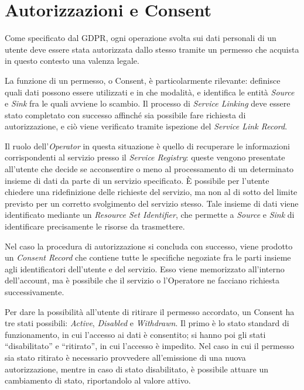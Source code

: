 \section{Autorizzazioni e Consent}
\label{sec:MD-AuthConsent}
Come specificato dal GDPR, ogni operazione svolta sui dati personali di un utente deve essere stata autorizzata dallo stesso tramite un permesso che acquista in questo contesto una valenza legale.

La funzione di un permesso, o Consent, \`e particolarmente rilevante: definisce quali dati possono essere utilizzati e in che modalit\`a, e identifica le entit\`a \textit{Source} e \textit{Sink} fra le quali avviene lo scambio. Il processo di \textit{Service Linking} deve essere stato completato con successo affinch\'e sia possibile fare richiesta di autorizzazione, e ci\`o viene verificato tramite ispezione del \textit{Service Link Record}.

Il ruolo dell’\textit{Operator} in questa situazione \`e quello di recuperare le informazioni corrispondenti al servizio presso il \textit{Service Registry}: queste vengono presentate all’utente che decide se acconsentire o meno al processamento di un determinato insieme di dati da parte di un servizio specificato. \`E possibile per l’utente chiedere una ridefinizione delle richieste del servizio, ma non al di sotto del limite previsto per un corretto svolgimento del servizio stesso. Tale insieme di dati viene identificato mediante un \textit{Resource Set Identifier}, che permette a \textit{Source} e \textit{Sink} di identificare precisamente le risorse da trasmettere.

Nel caso la procedura di autorizzazione si concluda con successo, viene prodotto un \textit{Consent Record} che contiene tutte le specifiche negoziate fra le parti insieme agli identificatori dell’utente e del servizio. Esso viene memorizzato all’interno dell’account, ma \`e possibile che il servizio o l’Operatore ne facciano richiesta successivamente. 

Per dare la possibilit\`a all’utente di ritirare il permesso accordato, un Consent ha tre stati possibili: \textit{Active}, \textit{Disabled} e \textit{Withdrawn}. Il primo \`e lo stato standard di funzionamento, in cui l’accesso ai dati \`e consentito; si hanno poi gli stati “disabilitato” e “ritirato”, in cui l’accesso \`e impedito. Nel caso in cui il permesso sia stato ritirato \`e necessario provvedere all’emissione di una nuova autorizzazione, mentre in caso di stato disabilitato, \`e possibile attuare un cambiamento di stato, riportandolo al valore attivo.

